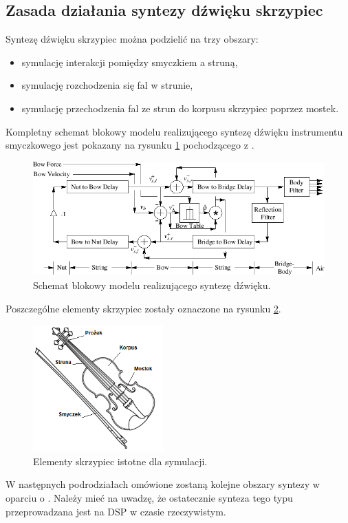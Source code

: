 \subsection{Zasada działania syntezy dźwięku skrzypiec}
Syntezę dźwięku skrzypiec można podzielić na trzy obszary:
\begin{itemize}
	\setlength\itemsep{-3pt}
	\item symulację interakcji pomiędzy smyczkiem a struną,
	\item symulację rozchodzenia się fal w strunie,
	\item symulację przechodzenia fal ze strun do korpusu skrzypiec poprzez mostek.
\end{itemize}
Kompletny schemat blokowy modelu realizującego syntezę dźwięku instrumentu smyczkowego jest pokazany na rysunku \ref{rys:schematblokowy} pochodzącego z \cite{bowed_3}.
\begin{figure}[H]
	\centering
	\includegraphics[width=12cm]{grafiki/schematblokowy}
	\captionsetup{justification=centering}
	\caption{Schemat blokowy modelu realizującego syntezę dźwięku.}
	\label{rys:schematblokowy}
\end{figure}
Poszczególne elementy skrzypiec zostały oznaczone na rysunku \ref{rys:skrzypce}.
\begin{figure}[H]
	\centering
	\includegraphics[width=5cm]{grafiki/skrzypce}
	\captionsetup{justification=centering}
	\caption{Elementy skrzypiec istotne dla symulacji.}
	\label{rys:skrzypce}
\end{figure}

W następnych podrodziałach omówione zostaną kolejne obszary syntezy w oparciu o \cite{bowed_smith}. Należy mieć na uwadzę, że ostatecznie synteza tego typu przeprowadzana jest na DSP w czasie rzeczywistym.



